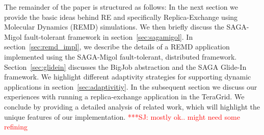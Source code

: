 \documentclass{rspublic}
\newcommand{\jhanote}[1]{ {\textcolor{red} { ***SJ: #1 }}}
\newcommand{\jhanote}[1]{}
\begin{document}

The remainder of the paper is structured as follows: In the next
section we provide the basic ideas behind RE and specifically
Replica-Exchange using Molecular Dynamics (REMD) simulations.  We then
briefly discuss the SAGA-Migol fault-tolerant framework in section~\ref{sec:sagamigol}. 
In section~\ref{sec:remd_impl}, we describe the details of a REMD
application implemented using the SAGA-Migol fault-tolerant,
distributed framework. Section~\ref{sec:glidein} discusses the
BigJob abstraction and the SAGA Glide-In framework. We highlight
different adaptivity strategies for supporting dynamic applications
in section~\ref{sec:adaptivitiy}.
In the subsequent section we discuss our experiences with running a replica-exchange
application in the TeraGrid.  We conclude by providing a detailed analysis of related
work, which will highlight the unique features of our implementation.
\jhanote{mostly ok.. might need some refining}
\end{document}
